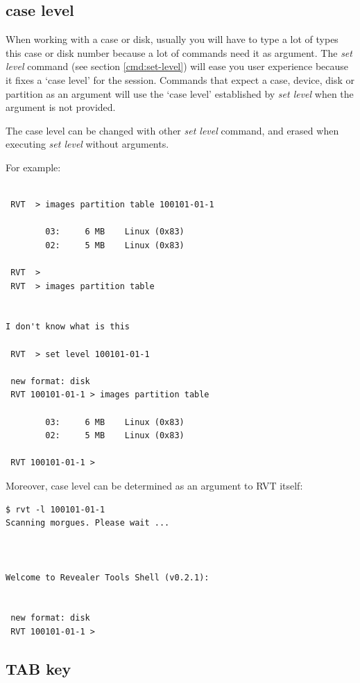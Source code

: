 \documentclass[a4paper,11pt,oneside]{report}
\begin{document}
\subsection{case level}

When working with a case or disk, usually you will have to type a lot of types this case or disk number because a lot of commands need it as argument. The \emph{set level} command (see section \ref{cmd:set-level}) will ease you user experience because it fixes a `case level' for the session. Commands that expect a case, device, disk or partition as an argument will use the `case level' established by \emph{set level} when the argument is not provided. 

The case level can be changed with other \emph{set level} command, and erased when executing \emph{set level} without arguments.

For example:

\begin{verbatim}

 RVT  > images partition table 100101-01-1                                    

        03:     6 MB    Linux (0x83)
        02:     5 MB    Linux (0x83)

 RVT  > 
 RVT  > images partition table


I don't know what is this

 RVT  > set level 100101-01-1                                                 

 new format: disk
 RVT 100101-01-1 > images partition table                                     

        03:     6 MB    Linux (0x83)
        02:     5 MB    Linux (0x83)

 RVT 100101-01-1 > 
\end{verbatim}


Moreover, case level can be determined as an argument to RVT itself:

\begin{verbatim}
$ rvt -l 100101-01-1
Scanning morgues. Please wait ...



Welcome to Revealer Tools Shell (v0.2.1):


 new format: disk
 RVT 100101-01-1 >  
\end{verbatim}



\subsection{TAB key}
\end{document}
